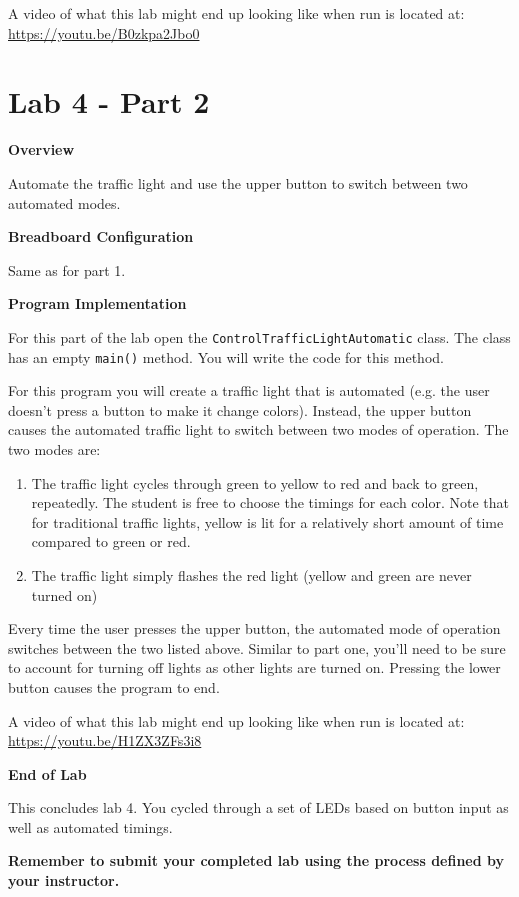 A video of what this lab might end up looking like when run is located at: \url{https://youtu.be/B0zkpa2Jbo0}

\section{Lab 4 - Part 2}

\textbf{Overview}

Automate the traffic light and use the upper button to switch between two automated modes. 

\textbf{Breadboard Configuration}

Same as for part 1.

\textbf{Program Implementation}

For this part of the lab open the \texttt{ControlTrafficLightAutomatic} class. The class has an empty \texttt{main()} method. You will write the code for this method.

For this program you will create a traffic light that is automated (e.g. the user doesn't press a button to make it change colors). Instead, the upper button causes the automated traffic light to switch between two modes of operation. The two modes are:

\begin{enumerate}
	\item The traffic light cycles through green to yellow to red and back to green, repeatedly. The student is free to choose the timings for each color. Note that for traditional traffic lights, yellow is lit for a relatively short amount of time compared to green or red.
	\item The traffic light simply flashes the red light (yellow and green are never turned on)
\end{enumerate}

Every time the user presses the upper button, the automated mode of operation switches between the two listed above. Similar to part one, you'll need to be sure to account for turning off lights as other lights are turned on. Pressing the lower button causes the program to end.

A video of what this lab might end up looking like when run is located at: \url{https://youtu.be/H1ZX3ZFs3i8}

\textbf{End of Lab}

This concludes lab 4. You cycled through a set of LEDs based on button input as well as automated timings.

\textbf{Remember to submit your completed lab using the process defined by your instructor.}

